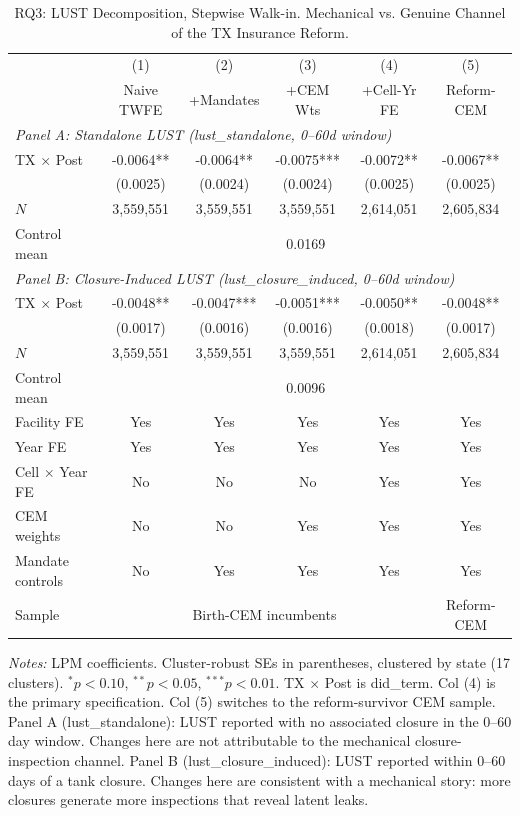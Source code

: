 \begin{table}[htbp]
\centering
\caption{RQ3: LUST Decomposition, Stepwise Walk-in. Mechanical vs. Genuine Channel of the TX Insurance Reform.}
\label{tab:rq3_stepwise}
\begin{tabular}{lccccc}
\toprule
 & (1) & (2) & (3) & (4) & (5) \\
 & Naive TWFE & +Mandates & +CEM Wts & +Cell-Yr FE & Reform-CEM \\
\midrule
\multicolumn{6}{l}{\textit{Panel A: Standalone LUST (lust\_standalone, 0--60d window)}} \\[0.3em]
TX $\times$ Post & -0.0064** & -0.0064** & -0.0075*** & -0.0072** & -0.0067** \\
& (0.0025) & (0.0024) & (0.0024) & (0.0025) & (0.0025) \\
$N$ & 3,559,551 & 3,559,551 & 3,559,551 & 2,614,051 & 2,605,834 \\
Control mean & \multicolumn{5}{c}{0.0169} \\
\midrule
\multicolumn{6}{l}{\textit{Panel B: Closure-Induced LUST (lust\_closure\_induced, 0--60d window)}} \\[0.3em]
TX $\times$ Post & -0.0048** & -0.0047*** & -0.0051*** & -0.0050** & -0.0048** \\
& (0.0017) & (0.0016) & (0.0016) & (0.0018) & (0.0017) \\
$N$ & 3,559,551 & 3,559,551 & 3,559,551 & 2,614,051 & 2,605,834 \\
Control mean & \multicolumn{5}{c}{0.0096} \\
\midrule
Facility FE         & Yes & Yes & Yes & Yes & Yes \\
Year FE             & Yes & Yes & Yes & Yes & Yes \\
Cell $\times$ Year FE & No & No & No & Yes & Yes \\
CEM weights         & No & No & Yes & Yes & Yes \\
Mandate controls    & No & Yes & Yes & Yes & Yes \\
Sample              & \multicolumn{4}{c}{Birth-CEM incumbents} & Reform-CEM \\
\bottomrule
\end{tabular}
\begin{minipage}{\linewidth}
\small
\textit{Notes:} LPM coefficients. Cluster-robust SEs in parentheses, clustered by state (17 clusters). $^{*}p<0.10$, $^{**}p<0.05$, $^{***}p<0.01$. TX $\times$ Post is did\_term. Col (4) is the primary specification. Col (5) switches to the reform-survivor CEM sample. Panel A (lust\_standalone): LUST reported with no associated closure in the 0--60 day window. Changes here are not attributable to the mechanical closure-inspection channel. Panel B (lust\_closure\_induced): LUST reported within 0--60 days of a tank closure. Changes here are consistent with a mechanical story: more closures generate more inspections that reveal latent leaks.
\end{minipage}
\end{table}
